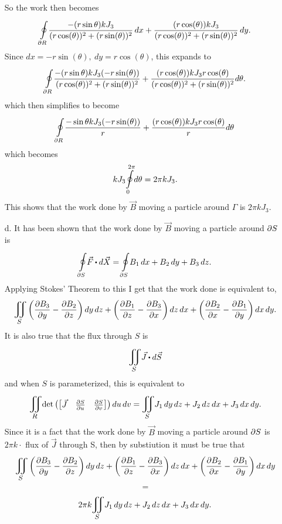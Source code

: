 \documentclass[titlepage]{article}
\begin{document}
\begin{solution}
\begin{itemize}
So the work then becomes
$$\boint{\p R}{}\frac{-(r\sin{\theta})kJ_3}{(r\cos(\theta))^2 + (r\sin(\theta))^2}\,dx + \frac{(r\cos(\theta))kJ_3}{(r\cos(\theta))^2 + (r\sin(\theta))^2}\,dy.$$
Since $dx = -r\sin(\theta), \ dy = r\cos(\theta)$, this expands to
$$\boint{\p R}{}\frac{-(r\sin{\theta})kJ_3(-r\sin(\theta))}{(r\cos(\theta))^2 + (r\sin(\theta))^2} + \frac{(r\cos(\theta))kJ_3r\cos(\theta)}{(r\cos(\theta))^2 + (r\sin(\theta))^2} d\theta.$$
which then simplifies to become 
$$\boint{\p R}{}\frac{-\sin{\theta}kJ_3(-r\sin(\theta))}{r} + \frac{(r\cos(\theta))kJ_3r\cos(\theta)}{r} d\theta $$
which becomes 
$$kJ_3\boint{0}{2\pi} d\theta = 2\pi kJ_3.$$
This shows that the work done by $\vec{B}$ moving a particle around $\Gamma$ is $2\pi kJ_3$.
\item[d.] It has been shown that the work done by $\vec{B}$ moving a particle around $\partial S$ is 
$$\boint{\p S}{} \vec{F} \bigcdot d\vec{X} = \boint{\p S}{} B_1\,dx + B_2\,dy + B_3\,dz.$$
Applying Stokes' Theorem to this I get that the work done is equivalent to,
$$\bigiint{S}{} \left(\frac{\p B_3}{\p y} - \frac{\p B_2}{\p z}\right)dy\,dz + \left(\frac{\p B_1}{\p z} - \frac{\p B_3}{\p x}\right)dz\,dx + \left(\frac{\p B_2}{\p x} - \frac{\p B_1}{\p y}\right)dx\,dy.$$
It is also true that the flux through $S$ is 
$$\bigiint{S}{} \vec{J}\bigcdot d\vec{S}$$
and when $S$ is parameterized, this is equivalent to 
$$\bigiint{R}{} \text{det}\left(\bmat{\vec{J} & \frac{\p S}{\p u} & \frac{\p S}{\p v}}\right)du\,dv
= \bigiint{S}{} J_1\,dy\,dz + J_2\,dz\,dx + J_3\,dx\,dy.$$
Since it is a fact that the work done by $\vec{B}$ moving a particle around  $\partial S$ is $2\pi k \cdot$ flux of  $\vec{J}$ through S, then by substiution it must be true that
$$ \bigiint{S}{} \left(\frac{\p B_3}{\p y} - \frac{\p B_2}{\p z}\right)dy\,dz + \left(\frac{\p B_1}{\p z} - \frac{\p B_3}{\p x}\right)dz\,dx + \left(\frac{\p B_2}{\p x} - \frac{\p B_1}{\p y}\right)dx\,dy $$ 
$$ = $$
$$2\pi k \bigiint{S}{} J_1\,dy\,dz + J_2\,dz\,dx + J_3\,dx\,dy.$$
\end{itemize}
\end{solution}
\end{document}
